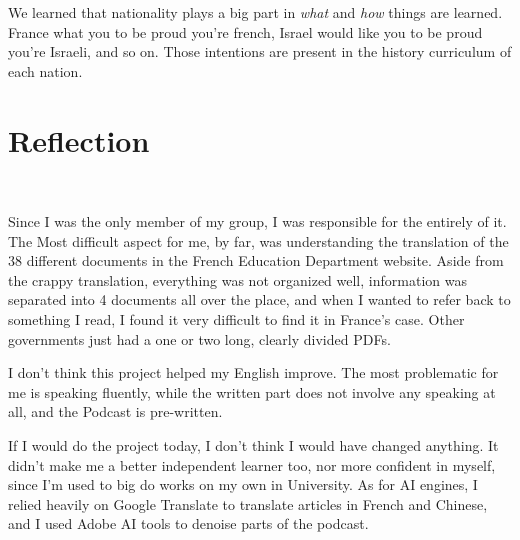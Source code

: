 \documentclass[12pt]{../../../tex/classes/styledArticle}
\newcommand\aftertitle{\ \!\!\!\!\!\!\!\!\!\!}
\begin{document}
	We learned that nationality plays a big part in \textit{what} and \textit{how} things are learned. France what you to be proud you're french, Israel would like you to be proud you're Israeli, and so on. Those intentions are present in the history curriculum of each nation. 
	
	\section{Reflection}\aftertitle
	
	Since I was the only member of my group, I was responsible for the entirely of it. The Most difficult aspect for me, by far, was understanding the translation of the 38 different documents in the French Education Department website. Aside from the crappy translation, everything was not organized well, information was separated into 4 documents all over the place, and when I wanted to refer back to something I read, I found it very difficult to find it in France's case. Other governments just had a one or two long, clearly divided PDFs. 
	
	I don't think this project helped my English improve. The most problematic for me is speaking fluently, while the written part does not involve any speaking at all, and the Podcast is pre-written. 
	
	If I would do the project today, I don't think I would have changed anything. It didn't make me a better independent learner too, nor more confident in myself, since I'm used to big do works on my own in University. As for AI engines, I relied heavily on Google Translate to translate articles in French and Chinese, and I used Adobe AI tools to denoise parts of the podcast. 
	
	
	
\end{document}
